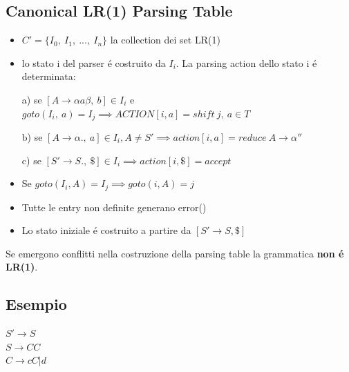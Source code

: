 \subsection{Canonical LR(1) Parsing Table}
\begin{itemize}
    \item $C' = \{ I_0,\ I_1,\ ...,\ I_n \}$ la collection dei set LR(1)\\
    \item lo stato i del parser \'e costruito da $I_i$. La parsing action dello stato i \'e determinata:\\
        \item[a)] se $[A \rightarrow \alpha a \beta,\ b] \in I_i$ e $goto(I_i,\ a) = I_j \implies ACTION[i, a] = shift\ j,\ a \in T$ \\
        \item[b)] se $[A \rightarrow \alpha .,\ a] \in I_i, A \not = S' \implies action[i, a] = reduce\ A \rightarrow \alpha '' $\\
        \item[c)] se $[S' \rightarrow S.,\ \$ ] \in I_i \implies action[i, \$] = accept$\\
    \item Se $goto(I_i, A) = I_j \implies goto(i, A) = j$\\
    \item Tutte le entry non definite generano error()\\
    \item Lo stato iniziale \'e costruito a partire da $[S' \rightarrow S, \$]$\\
\end{itemize}

\begin{tcolorbox}\begin{center}
    Se emergono conflitti nella costruzione della parsing table la grammatica \textbf{non \'e LR(1)}.
\end{center}\end{tcolorbox}

\subsection{Esempio}
$S' \rightarrow S$\\
$S \rightarrow CC$\\
$C \rightarrow cC|d$\\

